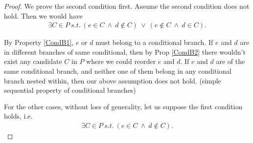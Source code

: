         \begin{proof}

            We prove the second condition first. 
            Assume the second condition does not hold. 
            Then we would have
            \begin{align*}
                \exists C \in P \ s.t. \ 
                (e \in C \ \wedge \ d \notin C) \ \vee \ 
                (e \notin C \ \wedge \ d \in C).
            \end{align*}
            
            By Property \ref{CondB1}, $e$ or $d$ must belong to a conditional branch. 
            If $e$ and $d$ are in different branches of same conditional, then by Prop \ref{CondB2} there wouldn't exist any candidate $C$ in $P$ where we could reorder $e$ and $d$. 
            If $e$ and $d$ are of the same conditional branch, and neither one of them belong in any conditional branch nested within, then our above assumption does not hold. (simple sequential property of conditional branches)
            
            For the other cases, without loss of generality, let us suppose the first condition holds, i.e. 
            \begin{align*}
                \exists C \in P \ s.t. \ 
                (e \in C \ \wedge \ d \notin C).
            \end{align*}


\end{proof}
